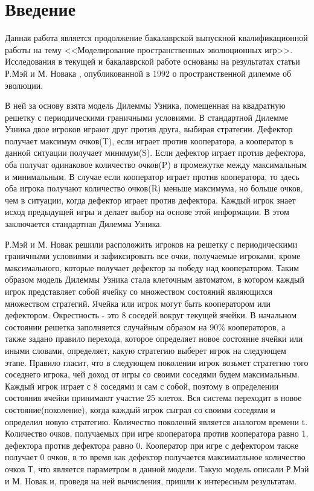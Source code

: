 \documentclass[14pt]{article}
\begin{document}
\section{Введение}
\par Данная работа является продолжение бакалаврской выпускной квалификационной работы на тему <<Моделирование пространственных эволюционных игр>>. Исследования в текущей и бакалаврской работе основаны на результатах статьи Р.Мэй и М. Новака \cite{nowak}, опубликованной в 1992 о пространственной дилемме об эволюции. \par В ней за основу взята модель Дилеммы Узника\cite{pd}, помещенная на квадратную решетку с периодическими граничными условиями. В стандартной Дилемме Узника двое игроков играют друг против друга, выбирая стратегии. Дефектор получает максимум очков(T), если играет против кооператора, а кооператор в данной ситуации получает минимум(S). Если дефектор играет против дефектора, оба получат одинаковое количество очков(P) в промежутке между максимальным и минимальным. В случае если кооператор играет против кооператора, то здесь оба игрока получают количество очков(R) меньше максимума, но больше очков, чем в ситуации, когда дефектор играет против дефектора. Каждый игрок знает исход предыдущей игры и делает выбор на основе этой информации. В этом заключается стандартная Дилемма Узника.
\par Р.Мэй и М. Новак решили расположить игроков на решетку с периодическими граничными условиями и зафиксировать все очки, получаемые игроками, кроме максимального, которые получает дефектор за победу над кооператором. Таким образом модель Дилеммы Узника стала клеточным автоматом, в котором каждый игрок представляет собой ячейку со множеством состояний являющихся множеством стратегий. Ячейка или игрок могут быть кооператором или дефектором. Окрестность - это 8 соседей вокруг текущей ячейки. В начальном состоянии решетка заполняется случайным образом на 90\% кооператоров, а также задано правило перехода, которое определяет новое состояние ячейки или иными словами, определяет, какую стратегию выберет игрок на следующем этапе. Правило гласит, что в следующем поколении игрок возьмет стратегию того соседнего игрока, чей доход от игры со своими соседями будем максимальным. Каждый игрок играет с 8 соседями и сам с собой, поэтому в определении состояния ячейки принимают участие 25 клеток. Вся система переходит в новое состояние(поколение), когда каждый игрок сыграл со своими соседями и определил новую стратегию. Количество поколений является аналогом времени t. Количество очков, получаемых при игре кооператора против кооператора равно 1, дефектора против дефектора равно 0. Кооператор при игре с дефектором также получает 0 очков, в то время как дефектор получается максиматльное количество очков Т, что является параметром в данной модели. Такую модель описали Р.Мэй и М. Новак и, проведя на ней вычисления, пришли к интересным результатам. 
\end{document}
